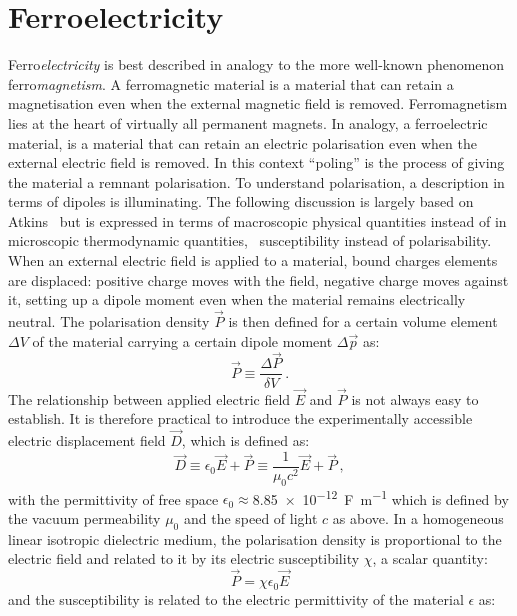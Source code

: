 \section{Ferroelectricity}
Ferro\emph{electricity} is best described in analogy to the more well-known phenomenon ferro\emph{magnetism}. A ferromagnetic material is a material that can retain a magnetisation even when the external magnetic field is removed. Ferromagnetism lies at the heart of virtually all permanent magnets. In analogy, a ferroelectric material, is a material that can retain an electric polarisation even when the external electric field is removed. In this context \enquote{poling} is the process of giving the material a remnant polarisation. To understand polarisation, a description in terms of dipoles is illuminating. The following discussion is largely based on Atkins~\cite[Chapters 18.1 to 18.3 and 20.10]{atkins} but is expressed in terms of macroscopic physical quantities instead of in microscopic thermodynamic quantities,~\eg{} susceptibility instead of polarisability. When an external electric field is applied to a material, bound charges elements are displaced: positive charge moves with the field, negative charge moves against it, setting up a dipole moment even when the material remains electrically neutral. The polarisation density $\vec{P}$ is then defined for a certain volume element $\Delta V$ of the material carrying a certain dipole moment $\Delta \vec{p}$ as:
\begin{equation}
	\vec{P} \equiv \frac{\Delta \vec{P}}{\delta V} \, .
\end{equation}
The relationship between applied electric field $\vec{E}$ and $\vec{P}$ is not always easy to establish. It is therefore practical to introduce the experimentally accessible electric displacement field $\vec{D}$, which is defined as:
\begin{equation}
	\vec{D} \equiv \epsilon_0 \vec{E} + \vec{P} \equiv \frac{1}{\mu _0 c^2} \vec{E} + \vec{P} \, ,
\end{equation}
with the permittivity of free space $\epsilon _0 \approx$\SI{8.85e-12}{\farad\per\metre} which is defined by the vacuum permeability $\mu _0$ and the speed of light $c$ as above. In a homogeneous linear isotropic dielectric medium, the polarisation density is proportional to the electric field and related to it by its electric susceptibility $\chi$, a scalar quantity:
\begin{equation}
	\vec{P} = \chi \epsilon_0 \vec{E}
\end{equation}
and the susceptibility is related to the electric permittivity of the material $\epsilon$ as:
